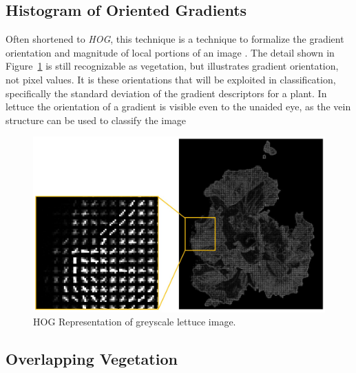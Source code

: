 \documentclass[letterpaper]{article}
\begin{document}
{\subsection{Histogram of Oriented Gradients}
Often shortened to \textit{HOG}, this technique is a technique to formalize the gradient orientation and magnitude of local portions of an image \parencite[p.~155]{Forsyth2012-hy}. The detail shown in Figure~\ref{fig:hog} is still recognizable as vegetation, but illustrates gradient orientation, not pixel values. It is these orientations that will be exploited in classification, specifically the standard deviation of the gradient descriptors for a plant. In lettuce the orientation of a gradient is visible even to the unaided eye, as the vein structure can be used to classify the image \parencite{Elhariri2014-eo}
\begin{figure}[h!]
	\centering
	\includegraphics[width=0.4\linewidth]{./figures/hog.jpg}
	\caption[HOG Representation of Lettuce]{HOG Representation of greyscale lettuce image.}
	\label{fig:hog}
\end{figure}

\subsection{Overlapping Vegetation}

}
\end{document}
